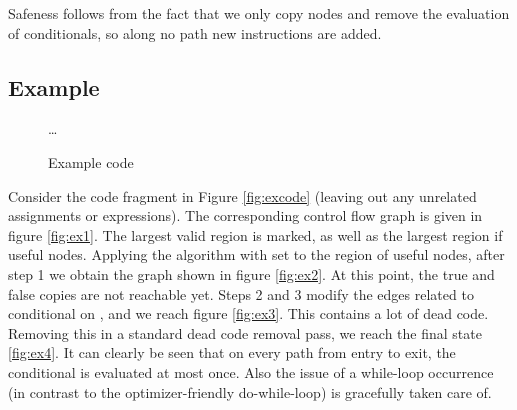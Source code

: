 \documentclass[halfparskip]{scrartcl}
\begin{document}
Safeness follows from the fact that we only copy nodes and remove the evaluation of conditionals, so along no path new instructions are added.

\subsection*{Example}

\begin{wrapfigure}{R}{0.4\linewidth}
\begin{algorithm}[H]
\eIf{\ldots}{
\lIf{}{\ldots}\lElse{\ldots}
}{}
\While{\ldots}{
\lIf{}{\ldots}\lElse{\ldots}
}
{\ldots}
\end{algorithm}
\caption{Example code}
\label{fig:excode}
\end{wrapfigure}


Consider the code fragment in Figure \vref{fig:excode} (leaving out any unrelated assignments or expressions).
The corresponding control flow graph is given in figure \vref{fig:ex1}. The largest valid region is marked, as well as the largest region if useful nodes. Applying the algorithm with  set to the region of useful nodes, after step 1 we obtain the graph shown in figure \vref{fig:ex2}. At this point, the true and false copies are not reachable yet. Steps 2 and 3 modify the edges related to conditional on , and we reach figure \vref{fig:ex3}. This contains a lot of dead code. Removing this in a standard dead code removal pass, we reach the final state \vref{fig:ex4}. It can clearly be seen that on every path from entry to exit, the conditional  is evaluated at most once. Also the issue of a while-loop occurrence (in contrast to the optimizer-friendly do-while-loop) is gracefully taken care of.
\end{document}
